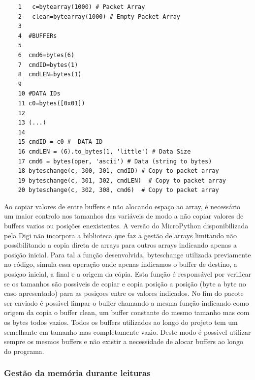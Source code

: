 	
\begin{verbatim}
	1   c=bytearray(1000) # Packet Array
	2   clean=bytearray(1000) # Empty Packet Array 
	3 
	4  #BUFFERs
	5 
	6  cmd6=bytes(6)
	7  cmdID=bytes(1)
	8  cmdLEN=bytes(1)
	9 
	10 #DATA IDs
	11 c0=bytes([0x01])
	12
	13 (...)	
	14
	15 cmdID = c0 #  DATA ID
	16 cmdLEN = (6).to_bytes(1, 'little') # Data Size
	17 cmd6 = bytes(oper, 'ascii') # Data (string to bytes)
	18 byteschange(c, 300, 301, cmdID) # Copy to packet array 
	19 byteschange(c, 301, 302, cmdLEN)  # Copy to packet array 
	20 byteschange(c, 302, 308, cmd6)  # Copy to packet array 
 \end{verbatim}

\par Ao copiar valores de entre buffers e não alocando espaço ao array, é necessário um maior controlo nos tamanhos das variáveis de modo a não copiar valores de buffers vazios ou posições enexistentes. A versão do MicroPython disponibilizada pela Digi não incorpora a biblioteca que faz a gestão de arrays limitando não possibilitando a copia direta de arrays para outros arrays indicando apenas a posição inicial. Para tal a função desenvolvida, byteschange utilizada previamente no código, simula essa operação onde apenas indicamos o buffer de destino, a posiçao inicial, a final e a origem da cópia. Esta função é responsável por verificar se os tamanhos são possiveis de copiar e copia posição a posição (byte a byte no caso apresentado) para as posiçoes entre os valores indicados. No fim do pacote ser enviado é possivel limpar o buffer chamando a mesma função indicando como origem da copia o buffer clean, um buffer constante do mesmo tamanho mas com os bytes todos vazios. Todos os buffers utilizados ao longo do projeto tem um semelhante em tamanho mas completamente vazio. Deste modo é possivel utilizar sempre os mesmos buffers e não existir a necessidade de alocar buffers ao longo do programa.

\subsubsection {Gestão da memória durante leituras}

